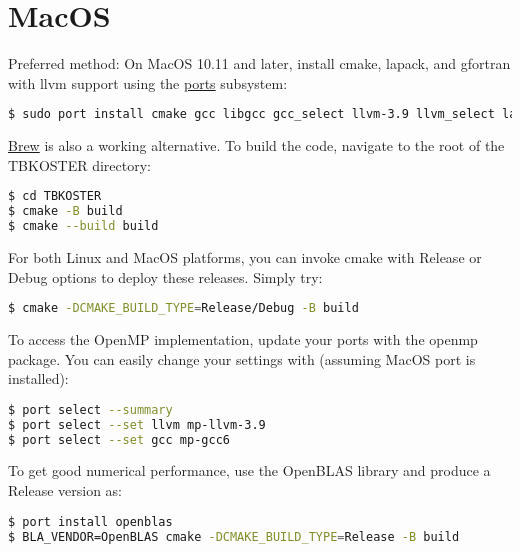 \documentclass[12pt, onecolumn]{memoir}
\begin{document}
\section{MacOS}
Preferred method: On MacOS 10.11 and later, install cmake, lapack, and gfortran with llvm support using the \href{https://www.macports.org}{ports} subsystem:
\begin{lstlisting}[language=sh,basicstyle=\small\ttfamily,frame=single]
$ sudo port install cmake gcc libgcc gcc_select llvm-3.9 llvm_select lapack libomp
\end{lstlisting}
\href{https://brew.sh}{Brew} is also a working alternative.
To build the code, navigate to the root of the TBKOSTER directory:
\begin{lstlisting}[language=sh,basicstyle=\small\ttfamily,frame=single]
$ cd TBKOSTER
$ cmake -B build
$ cmake --build build
\end{lstlisting}
For both Linux and MacOS platforms, you can invoke cmake with Release or Debug options to deploy these releases. Simply try:
\begin{lstlisting}[language=sh,basicstyle=\small\ttfamily]
$ cmake -DCMAKE_BUILD_TYPE=Release/Debug -B build
\end{lstlisting}
To access the OpenMP implementation, update your ports with the openmp package. You can easily change your settings with (assuming MacOS port is installed):
\begin{lstlisting}[language=sh,basicstyle=\small\ttfamily,frame=single]
$ port select --summary
$ port select --set llvm mp-llvm-3.9
$ port select --set gcc mp-gcc6
\end{lstlisting}
To get good numerical performance, use the OpenBLAS library and produce a Release version as:
\begin{lstlisting}[language=sh,basicstyle=\small\ttfamily,frame=single]
$ port install openblas
$ BLA_VENDOR=OpenBLAS cmake -DCMAKE_BUILD_TYPE=Release -B build
\end{lstlisting}
\end{document}

